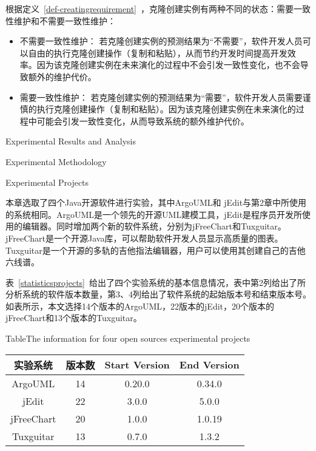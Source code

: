 根据定义~\ref{def-creatingrequirement}~，克隆创建实例有两种不同的状态：需要一致性维护和不需要一致性维护：
\begin{itemize}
\item 
不需要一致性维护：
若克隆创建实例的预测结果为“不需要”，软件开发人员可以自由的执行克隆创建操作（复制和粘贴），从而节约开发时间提高开发效率。因为该克隆创建实例在未来演化的过程中不会引发一致性变化，也不会导致额外的维护代价。
\item
需要一致性维护：
若克隆创建实例的预测结果为“需要”，软件开发人员需要谨慎的执行克隆创建操作（复制和粘贴）。因为该克隆创建实例在未来演化的过程中可能会引发一致性变化，从而导致系统的额外维护代价。
\end{itemize}

{Experimental Results and Analysis}

{Experimental Methodology}

{Experimental Projects}

本章选取了四个Java开源软件进行实验，其中ArgoUML和 jEdit与第2章中所使用的系统相同。ArgoUML是一个领先的开源UML建模工具，jEdit是程序员开发所使用的编辑器。同时增加两个新的软件系统，分别为jFreeChart和Tuxguitar。jFreeChart是一个开源Java库，可以帮助软件开发人员显示高质量的图表。Tuxguitar是一个开源的多轨的吉他指法编辑器，用户可以使用其创建自己的吉他六线谱。

表~\ref{statisticsprojects}~给出了四个实验系统的基本信息情况，表中第2列给出了所分析系统的软件版本数量，第3、4列给出了软件系统的起始版本号和结束版本号。如表所示，本文选择14个版本的ArgoUML，22版本的jEdit，20个版本的jFreeChart和13个版本的Tuxguitar。

\begin{table}[htbp]
{Table$\!$}{The information for four open sources experimental projects }
\vspace{0.5em}
\centering 
\wuhao
\begin{tabular}{cccc}
\toprule[1.5pt ]
{实验系统}&{版本数}&Start Version&End Version\\ 
\midrule[1pt]
ArgoUML&14&0.20.0&0.34.0\\ 
jEdit&22&3.0.0&5.0.0\\ 
jFreeChart&20&1.0.0&1.0.19\\ 
Tuxguitar&13&0.7.0&1.3.2\\ 
\bottomrule[1.5pt]
\end{tabular}
\end{table}

